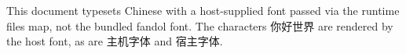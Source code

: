 \documentclass[11pt]{article}
\begin{document}
This document typesets Chinese with a host-supplied font passed via the runtime
files map, not the bundled fandol font. The characters 你好世界 are rendered by the
host font, as are 主机字体 and 宿主字体.
\end{document}
